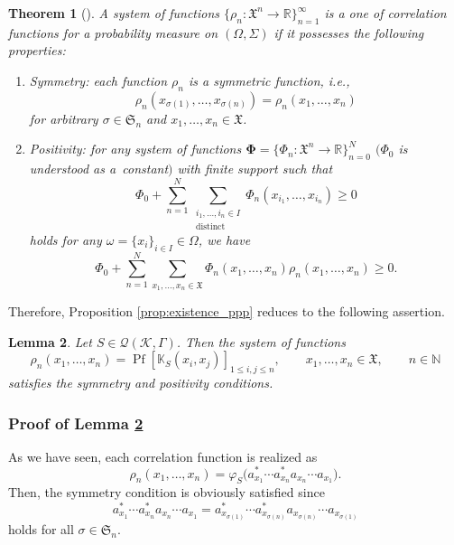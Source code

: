 \documentclass[11pt]{article}
\numberwithin{equation}{section}
\numberwithin{equation}{section}
\newtheorem{Theorem}{Theorem}[section]
\newtheorem{Lemma}[Theorem]{Lemma}
\newcommand{\pf}{\operatorname{Pf}}
\newcommand{\mfrak}[1]{\mathfrak{#1}}
\newcommand{\mcal}[1]{\mathcal{#1}}
\newcommand{\mbb}[1]{\mathbb{#1}}
\newcommand{\mrm}[1]{\mathrm{#1}}
\begin{document}
\begin{Theorem}[\cite{Lenard1975a, Lenard1975b}]
A system of functions $\big\{\rho_{n}\colon \mfrak{X}^{n}\to\mbb{R}\big\}_{n=1}^{\infty}$ is a one of correlation functions for a probability measure on $(\Omega,\Sigma)$ if it possesses the following properties:
\begin{enumerate}\itemsep=0pt
\item[$1.$] {\it Symmetry:} each function $\rho_{n}$ is a symmetric function, i.e.,
	\begin{equation*}
		\rho_{n}(x_{\sigma (1)},\dots, x_{\sigma (n)})=\rho_{n}(x_{1},\dots, x_{n})
	\end{equation*}
	for arbitrary $\sigma\in\mfrak{S}_{n}$ and $x_{1},\dots, x_{n}\in\mfrak{X}$.
\item[$2.$] {\it Positivity:} for any system of functions $\bm{\Phi}=\big\{\Phi_{n}\colon \mfrak{X}^{n}\to\mbb{R}\big\}_{n=0}^{N}$ $(\Phi_{0}$ is understood as a~constant$)$ with finite support such that
	\begin{equation}\label{eq:positivity_test_function}
		\Phi_{0}+\sum_{n=1}^{N}\sum_{\substack{i_{1},\dots,i_{n}\in I \\ \mrm{distinct}}}\Phi_{n}(x_{i_{1}},\dots, x_{i_{n}})\ge 0
	\end{equation}
	holds for any $\omega=\{x_{i}\}_{i\in I}\in\Omega$, we have
	\begin{equation*}
		\Phi_{0}+\sum_{n=1}^{N}\sum_{x_{1},\dots, x_{n}\in\mfrak{X}}\Phi_{n}(x_{1},\dots, x_{n})\rho_{n}(x_{1},\dots, x_{n})\ge 0.
	\end{equation*}
\end{enumerate}
\end{Theorem}

Therefore, Proposition \ref{prop:existence_ppp} reduces to the following assertion.
\begin{Lemma}
\label{lem:existence_ppp}
Let $S\in\mcal{Q}(\mcal{K},\Gamma)$. Then the system of functions
\begin{equation*}
	\rho_{n}(x_{1},\dots, x_{n})=\pf \left[\mbb{K}_{S}(x_{i},x_{j})\right]_{1\le i,j\le n}, \qquad x_{1},\dots, x_{n}\in\mfrak{X}, \qquad n\in\mbb{N}
\end{equation*}
satisfies the symmetry and positivity conditions.
\end{Lemma}

\subsubsection{Proof of Lemma \ref{lem:existence_ppp}}
As we have seen, each correlation function is realized as
\begin{equation*}
	\rho_{n}(x_{1},\dots, x_{n})=\varphi_{S}\big(a_{x_{1}}^{\ast}\cdots a_{x_{n}}^{\ast}a_{x_{n}}\cdots a_{x_{1}}\big).
\end{equation*}
Then, the symmetry condition is obviously satisfied since
\begin{equation*}
	a_{x_{1}}^{\ast}\cdots a_{x_{n}}^{\ast}a_{x_{n}}\cdots a_{x_{1}}
	=a_{x_{\sigma (1)}}^{\ast}\cdots a_{x_{\sigma (n)}}^{\ast}a_{x_{\sigma (n)}}\cdots a_{x_{\sigma (1)}}
\end{equation*}
holds for all $\sigma\in\mfrak{S}_{n}$.
\end{document}
